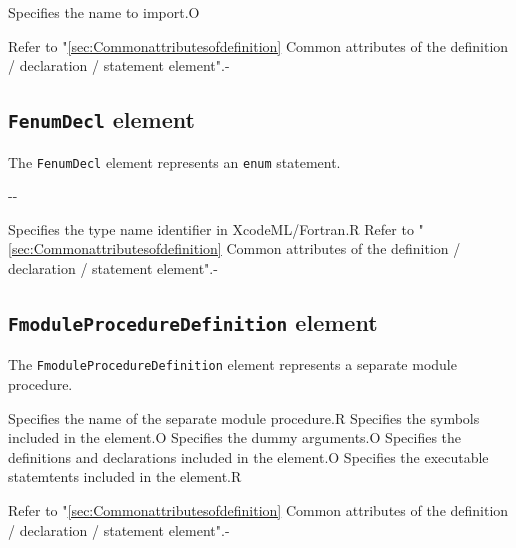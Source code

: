 \begin{XcodeMLChildElements}
{Specifies the name to import.}{O}
\end{XcodeMLChildElements}

\begin{XcodeMLAttributes}
{Refer to "\ref{sec:Commonattributesofdefinition} Common attributes of the definition / declaration / statement element".}{-}
\end{XcodeMLAttributes}


\subsection{ {\tt FenumDecl} element}

The {\tt FenumDecl} element represents an {\tt enum} statement.


\begin{XcodeMLChildElements}
  \XcodeMLElementDef{-}
  {-}{-}
\end{XcodeMLChildElements}

\begin{XcodeMLAttributes}
{Specifies the type name identifier in XcodeML/Fortran.}{R}
{Refer to "\ref{sec:Commonattributesofdefinition} Common attributes of the definition / declaration / statement element".}{-}
\end{XcodeMLAttributes}

\subsection{ {\tt FmoduleProcedureDefinition} element}

The {\tt FmoduleProcedureDefinition} element represents a separate module procedure.


\begin{XcodeMLChildElements}
{Specifies the name of  the separate module procedure.}{R}
{Specifies the symbols included in the element.}{O}
{Specifies the dummy arguments.}{O}
{Specifies the definitions and declarations included in the element.}{O}
{Specifies the executable statemtents included in the element.}{R}
\end{XcodeMLChildElements}

\begin{XcodeMLAttributes}
{Refer to "\ref{sec:Commonattributesofdefinition} Common attributes of the definition / declaration / statement element".}{-}
\end{XcodeMLAttributes}

